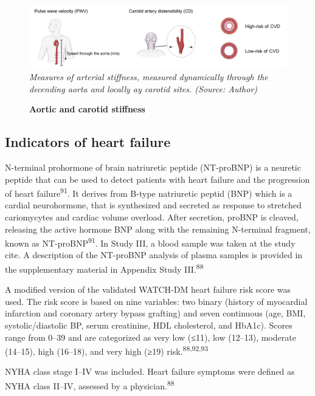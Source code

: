 \documentclass[
  a4paper,
  headsepline=true,
  open=left]{scrbook}
\begin{document}
\begin{figure}

{\centering 

\includegraphics{images/Methods_arterial_stiffness.pdf} \emph{Measures
of arterial stiffness, measured dynamically through the decending aorta
and locally ay carotid sites. (Source: Author)}

}

\caption{\label{fig-as}\textbf{Aortic and carotid stiffness}}

\end{figure}

\hypertarget{indicators-of-heart-failure}{%
\subsection{Indicators of heart
failure}\label{indicators-of-heart-failure}}

N-terminal prohormone of brain natriuretic peptide (NT-proBNP) is a
neuretic peptide that can be used to detect patients with heart failure
and the progression of heart failure\textsuperscript{91}. It derives
from B-type natriuretic peptid (BNP) which is a cardial neurohormone,
that is synthesized and secreted as response to stretched cariomycytes
and cardiac volume overload. After secretion, proBNP is cleaved,
releasing the active hormone BNP along with the remaining N-terminal
fragment, known as NT-proBNP\textsuperscript{91}. In Study III, a blood
sample was taken at the study cite. A description of the NT-proBNP
analysis of plasma samples is provided in the supplementary material in
Appendix Study III.\textsuperscript{88}

A modified version of the validated WATCH-DM heart failure risk score
was used. The risk score is based on nine variables: two binary (history
of myocardial infarction and coronary artery bypass grafting) and seven
continuous (age, BMI, systolic/diastolic BP, serum creatinine, HDL
cholesterol, and HbA1c). Scores range from 0--39 and are categorized as
very low (≤11), low (12--13), moderate (14--15), high (16--18), and very
high (≥19) risk.\textsuperscript{88,92,93}

NYHA class stage I--IV was included. Heart failure symptoms were defined
as NYHA class II--IV, assessed by a physician.\textsuperscript{88}
\end{document}
